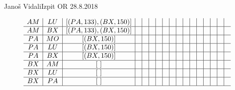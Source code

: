 \begin{naloga}{Janoš Vidali}{Izpit OR 28.8.2018}
\begin{odgovor}
\begin{tabela}
\begin{small}
$$\begin{array}{c|c|c|c|c|c|c|c|c|c|c|c|c|c|c|c|c}
AM & LU & [(PA, 133), (BX, 150)] &  & & & & & & & & & & & & & \\ \hline
AM & BX & [(PA, 133), (BX, 150)] &  & & & & & & & & & & & & & \\ \hline
PA & MO & [(BX, 150)] &  & & & & & & & & & & & & & \\ \hline
PA & LU & [(BX, 150)] &  & & & & & & & & & & & & & \\ \hline
PA & BX & [(BX, 150)] &  & & & & & & & & & & & & & \\ \hline
BX & AM & [\ ] & & & & & & & & & & & & & & \\ \hline
BX & LU & [\ ] &  & & & & & & & & & & & & & \\ \hline
BX & PA & [\ ] &  & & & & & & & & & & & & & \\ \hline
\end{array}
$$
\end{small}
\end{tabela}




\end{odgovor}
\end{naloga}
